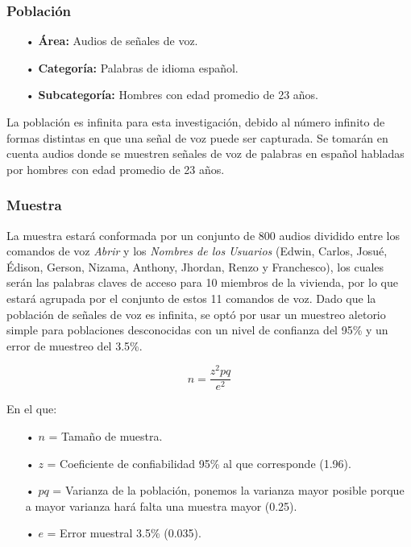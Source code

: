 \subsubsection{Población}
\begin{enumerate}
\item[•]\textbf{Área:} Audios de señales de voz.
\item[•]\textbf{Categoría:} Palabras de idioma español.
\item[•]\textbf{Subcategoría:} Hombres con edad promedio de 23 años.
\end{enumerate}
La población es infinita para esta investigación, debido al número infinito de formas distintas en que una señal de voz puede ser capturada. Se tomarán en cuenta audios donde se muestren señales de voz de palabras en español habladas por hombres con edad promedio de 23 años.

\subsubsection{Muestra}
La muestra estará conformada por un conjunto de 800 audios dividido entre los comandos de voz \textit{Abrir} y los \textit{Nombres de los Usuarios} (Edwin, Carlos, Josué, Édison, Gerson, Nizama, Anthony, Jhordan, Renzo y Franchesco), los cuales serán las palabras claves de acceso para 10 miembros de la vivienda, por lo que estará agrupada por el conjunto de estos 11 comandos de voz.
\vskip 0.5cm
Dado que la población de señales de voz es infinita, se optó por usar un muestreo aletorio simple para poblaciones desconocidas con un nivel de confianza del 95\% y un error de muestreo del 3.5\%.

\begin{equation}
\label{eq:ecuacion}
n = \frac{z^{2}pq}{e^2}
\end{equation}

En el que:
\begin{enumerate}
\item[•]$n$ = Tamaño de muestra.
\item[•]$z$ = Coeficiente de confiabilidad 95\% al que corresponde (1.96).
\item[•]$pq$ = Varianza de la población, ponemos la varianza mayor posible porque a mayor varianza hará falta una muestra mayor (0.25).
\item[•]$e$ = Error muestral 3.5\% (0.035).
\end{enumerate}

